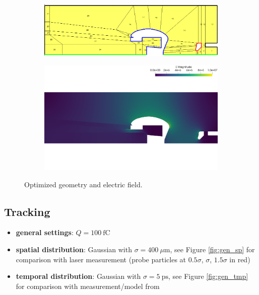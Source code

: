 \begin{center}
\begin{figure}[H]
   \begin{subfigure}{0.45\textwidth}
      \includegraphics[width=\textwidth]{fig/geometry_v6_opt_order=3_run1}
   \end{subfigure}
   \begin{subfigure}{0.45\textwidth}
      \includegraphics[width=\textwidth]{fig/E_v6_opt_order=3_run1}
   \end{subfigure}
   \caption{Optimized geometry and electric field.}
   \label{fig:opt}
\end{figure}
\end{center}

\subsection{Tracking}
\begin{itemize}
   \item \textbf{general settings}: $Q=100\ \mathrm{fC}$
   \item \textbf{spatial distribution}: Gaussian with $\sigma=400\ \mu\mathrm{m}$, see Figure \ref{fig:gen_sp} for comparison with laser measurement (probe particles at $0.5\sigma$, $\sigma$, $1.5\sigma$ in red)
   \item \textbf{temporal distribution}: Gaussian with $\sigma=5\ \mathrm{ps}$, see Figure \ref{fig:gen_tmp} for comparison with measurement/model from \cite{wagner}
\end{itemize}

